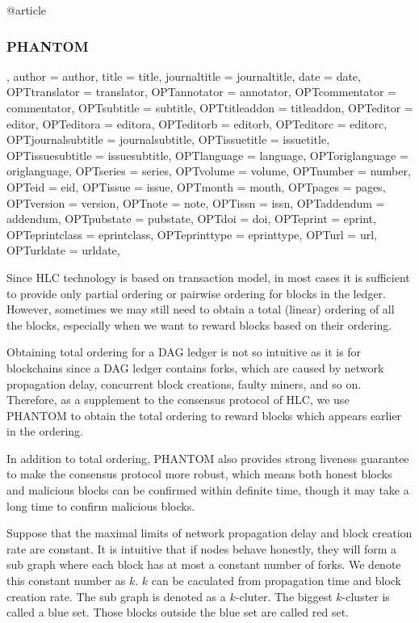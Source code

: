 \documentclass[a4paper,11pt]{article}
\begin{document}
@article{\subsubsection{PHANTOM},
	author = {author},
	title = {title},
	journaltitle = {journaltitle},
	date = {date},
	OPTtranslator = {translator},
	OPTannotator = {annotator},
	OPTcommentator = {commentator},
	OPTsubtitle = {subtitle},
	OPTtitleaddon = {titleaddon},
	OPTeditor = {editor},
	OPTeditora = {editora},
	OPTeditorb = {editorb},
	OPTeditorc = {editorc},
	OPTjournalsubtitle = {journalsubtitle},
	OPTissuetitle = {issuetitle},
	OPTissuesubtitle = {issuesubtitle},
	OPTlanguage = {language},
	OPToriglanguage = {origlanguage},
	OPTseries = {series},
	OPTvolume = {volume},
	OPTnumber = {number},
	OPTeid = {eid},
	OPTissue = {issue},
	OPTmonth = {month},
	OPTpages = {pages},
	OPTversion = {version},
	OPTnote = {note},
	OPTissn = {issn},
	OPTaddendum = {addendum},
	OPTpubstate = {pubstate},
	OPTdoi = {doi},
	OPTeprint = {eprint},
	OPTeprintclass = {eprintclass},
	OPTeprinttype = {eprinttype},
	OPTurl = {url},
	OPTurldate = {urldate},
}


Since HLC technology is based on transaction model, in most cases it is
sufficient to provide only partial ordering or pairwise ordering for blocks in
the ledger. However, sometimes we may still need to obtain a total (linear)
ordering of all the blocks, especially when we want to reward blocks based on
their ordering. 

Obtaining total ordering for a DAG ledger is not so intuitive as it is for
blockchains since a DAG ledger contains forks, which are caused by network
propagation delay, concurrent block creations, faulty miners, and so on.
Therefore, as a supplement to the consensus protocol of HLC, we use PHANTOM to
obtain the total ordering to reward blocks which appears earlier in the
ordering.

In addition to total ordering, PHANTOM also provides strong liveness guarantee
to make the consensus protocol more robust, which means both honest blocks and
malicious blocks can be confirmed within definite time, though it may take a
long time to confirm malicious blocks.

Suppose that the maximal limits of network propagation delay and block creation
rate are constant. It is intuitive that if nodes behave honestly, they will form
a sub graph where each block has at most a constant number of forks. We denote
this constant number as $k$. $k$ can be caculated from propagation time and
block creation rate. The sub graph is denoted as a $k$-cluter. The biggest
$k$-cluster is called a blue set. Those blocks outside the blue set are called
red set.
\end{document}
